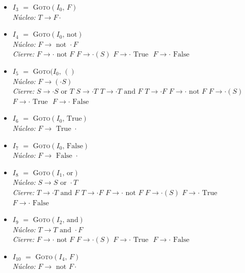 \documentclass[12pt, letterpaper]{article}
\begin{document}
\begin{enumerate}
\begin{itemize}
\item \textbf{$I_{3}$} $=$ \textsc{Goto}$(I_{0},\,F)$ \\
\textit{Núcleo:} $T \to F \cdot $

\item \textbf{$I_{4}$} $=$ \textsc{Goto}$(I_{0},\,\text{not})$ \\
\textit{Núcleo:} $F \to \text{ not } \cdot F$ \\
\textit{Cierre:} $F \to  \cdot \text{ not } F$ \quad $F \to  \cdot ( S )$ \quad $F \to  \cdot \text{ True }$ \quad $F \to  \cdot \text{ False }$

\item \textbf{$I_{5}$} $=$ \textsc{Goto}$(I_{0},\,()$ \\
\textit{Núcleo:} $F \to ( \cdot S )$ \\
\textit{Cierre:} $S \to  \cdot S \text{ or } T$ \quad $S \to  \cdot T$ \quad $T \to  \cdot T \text{ and } F$ \quad $T \to  \cdot F$ \quad $F \to  \cdot \text{ not } F$ \quad $F \to  \cdot ( S )$ \quad $F \to  \cdot \text{ True }$ \quad $F \to  \cdot \text{ False }$

\item \textbf{$I_{6}$} $=$ \textsc{Goto}$(I_{0},\,\text{True})$ \\
\textit{Núcleo:} $F \to \text{ True } \cdot $

\item \textbf{$I_{7}$} $=$ \textsc{Goto}$(I_{0},\,\text{False})$ \\
\textit{Núcleo:} $F \to \text{ False } \cdot $

\item \textbf{$I_{8}$} $=$ \textsc{Goto}$(I_{1},\,\text{or})$ \\
\textit{Núcleo:} $S \to S \text{ or } \cdot T$ \\
\textit{Cierre:} $T \to  \cdot T \text{ and } F$ \quad $T \to  \cdot F$ \quad $F \to  \cdot \text{ not } F$ \quad $F \to  \cdot ( S )$ \quad $F \to  \cdot \text{ True }$ \quad $F \to  \cdot \text{ False }$

\item \textbf{$I_{9}$} $=$ \textsc{Goto}$(I_{2},\,\text{and})$ \\
\textit{Núcleo:} $T \to T \text{ and } \cdot F$ \\
\textit{Cierre:} $F \to  \cdot \text{ not } F$ \quad $F \to  \cdot ( S )$ \quad $F \to  \cdot \text{ True }$ \quad $F \to  \cdot \text{ False }$

\item \textbf{$I_{10}$} $=$ \textsc{Goto}$(I_{4},\,F)$ \\
\textit{Núcleo:} $F \to \text{ not } F \cdot $


\end{itemize}
\end{enumerate}
\end{document}
